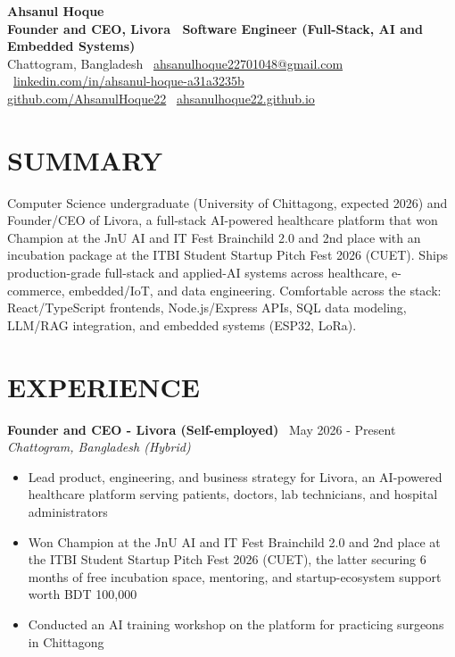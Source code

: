 \documentclass[10.5pt,a4paper]{article}
\newenvironment{tightitemize}{
  \begin{itemize}[leftmargin=15pt, itemsep=0pt, parsep=0pt, topsep=1pt]
}{
  \end{itemize}
}
\newcommand{\entry}[3]{%
  \textbf{#1} \textbar\ #2\\
  \textit{#3}%
}
\begin{document}
{\huge \bfseries Ahsanul Hoque}\\[2pt]
{\bfseries Founder and CEO, Livora \textbar\ Software Engineer (Full-Stack, AI and Embedded Systems)}\\[5pt]
{\small
  Chattogram, Bangladesh \textbar\
  \href{mailto:ahsanulhoque22701048@gmail.com}{ahsanulhoque22701048@gmail.com} \textbar\
  \href{https://linkedin.com/in/ahsanul-hoque-a31a3235b}{linkedin.com/in/ahsanul-hoque-a31a3235b} \textbar\\
  \href{https://github.com/AhsanulHoque22}{github.com/AhsanulHoque22} \textbar\
  \href{https://ahsanulhoque22.github.io}{ahsanulhoque22.github.io}
}

\section*{SUMMARY}
Computer Science undergraduate (University of Chittagong, expected 2026) and Founder/CEO of Livora, a full-stack AI-powered healthcare platform that won Champion at the JnU AI and IT Fest Brainchild 2.0 and 2nd place with an incubation package at the ITBI Student Startup Pitch Fest 2026 (CUET). Ships production-grade full-stack and applied-AI systems across healthcare, e-commerce, embedded/IoT, and data engineering. Comfortable across the stack: React/TypeScript frontends, Node.js/Express APIs, SQL data modeling, LLM/RAG integration, and embedded systems (ESP32, LoRa).

\section*{EXPERIENCE}

\entry{Founder and CEO - Livora (Self-employed)}{May 2026 - Present}{Chattogram, Bangladesh (Hybrid)}
\begin{tightitemize}
  \item Lead product, engineering, and business strategy for Livora, an AI-powered healthcare platform serving patients, doctors, lab technicians, and hospital administrators
  \item Won Champion at the JnU AI and IT Fest Brainchild 2.0 and 2nd place at the ITBI Student Startup Pitch Fest 2026 (CUET), the latter securing 6 months of free incubation space, mentoring, and startup-ecosystem support worth BDT 100,000
  \item Conducted an AI training workshop on the platform for practicing surgeons in Chittagong
\end{tightitemize}
\end{document}
